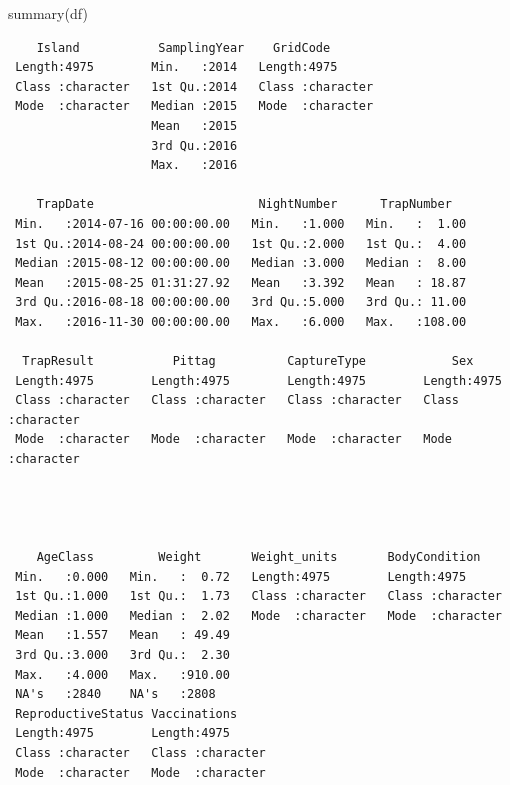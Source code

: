 \documentclass[
  letterpaper,
]{report}
\newenvironment{Shaded}{\begin{snugshade}}{\end{snugshade}}
\newcommand{\FunctionTok}[1]{\textcolor[rgb]{0.28,0.35,0.67}{#1}}
\newcommand{\NormalTok}[1]{\textcolor[rgb]{0.00,0.23,0.31}{#1}}
\begin{document}
\begin{Shaded}
\begin{Highlighting}[]
\FunctionTok{summary}\NormalTok{(df)}
\end{Highlighting}
\end{Shaded}

\begin{verbatim}
    Island           SamplingYear    GridCode        
 Length:4975        Min.   :2014   Length:4975       
 Class :character   1st Qu.:2014   Class :character  
 Mode  :character   Median :2015   Mode  :character  
                    Mean   :2015                     
                    3rd Qu.:2016                     
                    Max.   :2016                     
                                                     
    TrapDate                       NightNumber      TrapNumber    
 Min.   :2014-07-16 00:00:00.00   Min.   :1.000   Min.   :  1.00  
 1st Qu.:2014-08-24 00:00:00.00   1st Qu.:2.000   1st Qu.:  4.00  
 Median :2015-08-12 00:00:00.00   Median :3.000   Median :  8.00  
 Mean   :2015-08-25 01:31:27.92   Mean   :3.392   Mean   : 18.87  
 3rd Qu.:2016-08-18 00:00:00.00   3rd Qu.:5.000   3rd Qu.: 11.00  
 Max.   :2016-11-30 00:00:00.00   Max.   :6.000   Max.   :108.00  
                                                                  
  TrapResult           Pittag          CaptureType            Sex           
 Length:4975        Length:4975        Length:4975        Length:4975       
 Class :character   Class :character   Class :character   Class :character  
 Mode  :character   Mode  :character   Mode  :character   Mode  :character  
                                                                            
                                                                            
                                                                            
                                                                            
    AgeClass         Weight       Weight_units       BodyCondition     
 Min.   :0.000   Min.   :  0.72   Length:4975        Length:4975       
 1st Qu.:1.000   1st Qu.:  1.73   Class :character   Class :character  
 Median :1.000   Median :  2.02   Mode  :character   Mode  :character  
 Mean   :1.557   Mean   : 49.49                                        
 3rd Qu.:3.000   3rd Qu.:  2.30                                        
 Max.   :4.000   Max.   :910.00                                        
 NA's   :2840    NA's   :2808                                          
 ReproductiveStatus Vaccinations      
 Length:4975        Length:4975       
 Class :character   Class :character  
 Mode  :character   Mode  :character  
                                      
                                      
                                      
                                      
\end{verbatim}
\end{document}
